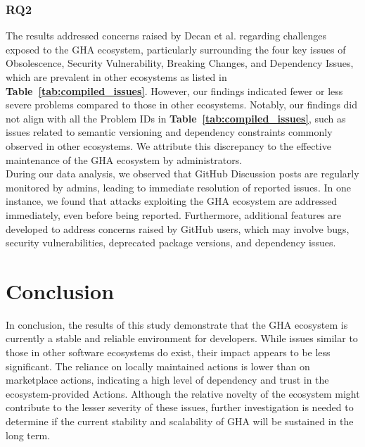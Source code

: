 \documentclass[conference]{IEEEtran}
\begin{document}
    \subsubsection{\textbf{RQ2}} The results addressed concerns raised by Decan et al. \cite{decan2022use} regarding challenges exposed to the GHA ecosystem, particularly surrounding the four key issues of Obsolescence, Security Vulnerability, Breaking Changes, and Dependency Issues, which are prevalent in other ecosystems as listed in \textbf{Table~\ref{tab:compiled_issues}}. However, our findings indicated fewer or less severe problems compared to those in other ecosystems. Notably, our findings did not align with all the Problem IDs in \textbf{Table~\ref{tab:compiled_issues}}, such as issues related to semantic versioning and dependency constraints commonly observed in other ecosystems. We attribute this discrepancy to the effective maintenance of the GHA ecosystem by administrators.\\
        During our data analysis, we observed that GitHub Discussion posts are regularly monitored by admins, leading to immediate resolution of reported issues. In one instance, we found that attacks exploiting the GHA ecosystem are addressed immediately, even before being reported. Furthermore, additional features are developed to address concerns raised by GitHub users, which may involve bugs, security vulnerabilities, deprecated package versions, and dependency issues.
    \section{Conclusion}
        In conclusion, the results of this study demonstrate that the GHA ecosystem is currently a stable and reliable environment for developers. While issues similar to those in other software ecosystems do exist, their impact appears to be less significant. The reliance on locally maintained actions is lower than on marketplace actions, indicating a high level of dependency and trust in the ecosystem-provided Actions. Although the relative novelty of the ecosystem might contribute to the lesser severity of these issues, further investigation is needed to determine if the current stability and scalability of GHA will be sustained in the long term.
    
\end{document}

